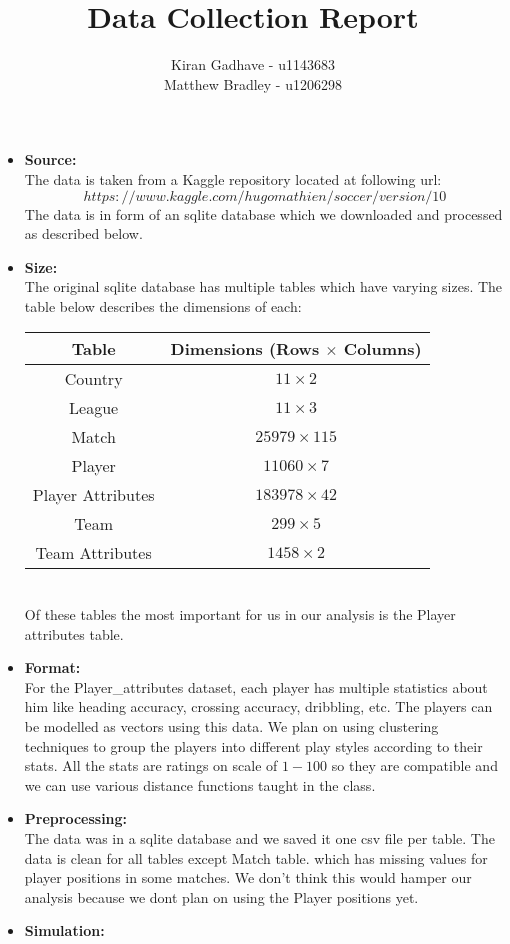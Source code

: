 \documentclass[11pt]{extarticle}
\title{Data Collection Report}
\author{Kiran Gadhave - u1143683\\Matthew Bradley - u1206298}
\newcommand{\<}{\langle}
\renewcommand{\>}{\rangle}
\theoremstyle{definition}
\begin{document}
\maketitle

\begin{itemize}

	\item \textbf{Source:}\\
	The data is taken from a Kaggle repository located at following url: 
	$$https://www.kaggle.com/hugomathien/soccer/version/10 $$
	The data is in form of an sqlite database which we downloaded and processed as described below.
	\item \textbf{Size:}\\
	The original sqlite database has multiple tables which have varying sizes. The table below describes the dimensions of each:
	\begin{table}[h!]
		\begin{center}
			\begin{tabular}{c|c}
				\textbf{Table} & \textbf{Dimensions (Rows $\times$ Columns)} \\
				\hline
				Country & $11 \times 2$\\
				League & $11 \times 3$\\
				Match & $25979 \times 115$\\
				Player & $11060 \times 7$\\
				Player Attributes & $183978 \times 42$\\
				Team & $299 \times 5$\\
				Team Attributes & $1458 \times 2$\\
			\end{tabular}
		\end{center}
	\end{table}
	\\
	Of these tables the most important for us in our analysis is the Player attributes table.
	\item \textbf{Format:}\\
	For the Player\_attributes dataset, each player has multiple statistics about him like heading accuracy, crossing accuracy, dribbling, etc. The players can be modelled as vectors using this data. We plan on using clustering techniques to group the players into different play styles according to their stats. All the stats are ratings on scale of $1-100$ so they are compatible and we can use various distance functions taught in the class.
	\item \textbf{Preprocessing:}\\
	The data was in a sqlite database and we saved it one csv file per table. The data is clean for all tables except Match table. which has missing values for player positions in some matches. We don't think this would hamper our analysis because we dont plan on using the Player positions yet.
	\item \textbf{Simulation:}\\

\end{itemize}
\end{document}
